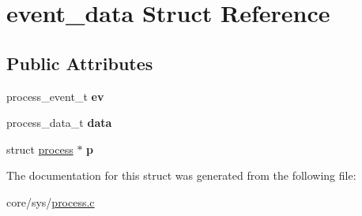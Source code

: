 \hypertarget{structevent__data}{\section{event\-\_\-data Struct Reference}
\label{structevent__data}
}
\subsection*{Public Attributes}
\begin{DoxyCompactItemize}
\item 
\hypertarget{structevent__data_a1a248c2d2f96acb94201e24244d7e59b}{process\-\_\-event\-\_\-t {\bfseries ev}}\label{structevent__data_a1a248c2d2f96acb94201e24244d7e59b}

\item 
\hypertarget{structevent__data_a1e5a29315d641ff53e0175127928a6b1}{process\-\_\-data\-\_\-t {\bfseries data}}\label{structevent__data_a1e5a29315d641ff53e0175127928a6b1}

\item 
\hypertarget{structevent__data_a48781817b6fc00c2af8958b06b5ab308}{struct \hyperlink{structprocess}{process} $\ast$ {\bfseries p}}\label{structevent__data_a48781817b6fc00c2af8958b06b5ab308}

\end{DoxyCompactItemize}


The documentation for this struct was generated from the following file\-:\begin{DoxyCompactItemize}
\item 
core/sys/\hyperlink{process_8c}{process.\-c}\end{DoxyCompactItemize}
